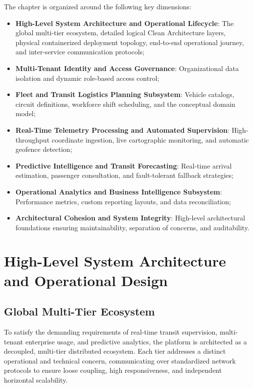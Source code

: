 The chapter is organized around the following key dimensions:
\begin{itemize}
  \item \textbf{High-Level System Architecture and Operational Lifecycle}: The global multi-tier ecosystem, detailed logical Clean Architecture layers, physical containerized deployment topology, end-to-end operational journey, and inter-service communication protocols;
  \item \textbf{Multi-Tenant Identity and Access Governance}: Organizational data isolation and dynamic role-based access control;
  \item \textbf{Fleet and Transit Logistics Planning Subsystem}: Vehicle catalogs, circuit definitions, workforce shift scheduling, and the conceptual domain model;
  \item \textbf{Real-Time Telemetry Processing and Automated Supervision}: High-throughput coordinate ingestion, live cartographic monitoring, and automatic geofence detection;
  \item \textbf{Predictive Intelligence and Transit Forecasting}: Real-time arrival estimation, passenger consultation, and fault-tolerant fallback strategies;
  \item \textbf{Operational Analytics and Business Intelligence Subsystem}: Performance metrics, custom reporting layouts, and data reconciliation;
  \item \textbf{Architectural Cohesion and System Integrity}: High-level architectural foundations ensuring maintainability, separation of concerns, and auditability.
\end{itemize}

\section{High-Level System Architecture and Operational Design}
\label{sec:global_architecture}

\subsection{Global Multi-Tier Ecosystem}
To satisfy the demanding requirements of real-time transit supervision, multi-tenant enterprise usage, and predictive analytics, the  platform is architected as a decoupled, multi-tier distributed ecosystem. Each tier addresses a distinct operational and technical concern, communicating over standardized network protocols to ensure loose coupling, high responsiveness, and independent horizontal scalability.

